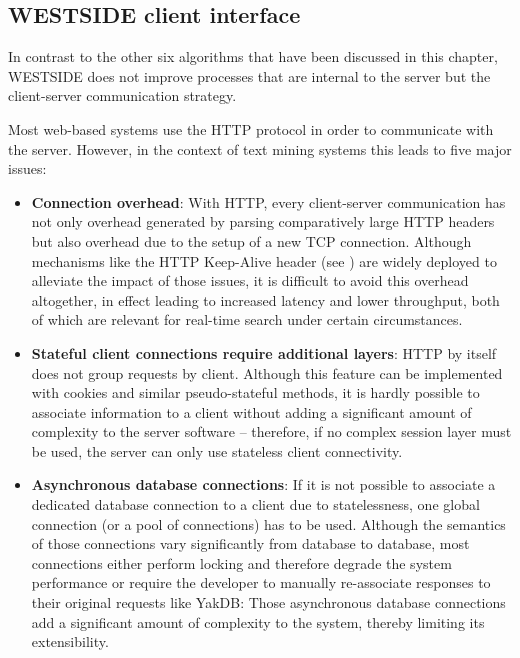 \documentclass[a4paper, 12pt, twoside, reqn]{report}
\numberwithin{figure}{chapter}
\newtheorem[L]{boxedDefinition}{Definition}
\newtheorem[L]{boxedExample}{Example}
\begin{document}
\afterpage{\clearpage}


\subsection{WESTSIDE client interface}\label{sec:westside}

In contrast to the other six algorithms that have been discussed in this chapter, WESTSIDE does not improve processes that are internal to the server but the client-server communication strategy.

Most web-based systems use the HTTP protocol in order to communicate with the server. However, in the context of text mining systems this leads to five major issues:
\begin{itemize}
 \item \textbf{Connection overhead}: With HTTP, every client-server communication has not only overhead generated by parsing comparatively large HTTP headers but also overhead due to the setup of a new TCP connection. Although mechanisms like the HTTP Keep-Alive header (see \cite{nielsen1997network}) are widely deployed to alleviate the impact of those issues, it is difficult to avoid this overhead altogether, in effect leading to increased latency and lower throughput, both of which are relevant for real-time search under certain circumstances.
 
 \item \textbf{Stateful client connections require additional layers}: HTTP by itself does not group requests by client. Although this feature can be implemented with cookies and similar pseudo-stateful methods, it is hardly possible to associate information to a client without adding a significant amount of complexity to the server software -- therefore, if no complex session layer must be used, the server can only use stateless client connectivity.
 
 \item \textbf{Asynchronous database connections}: If it is not possible to associate a dedicated database connection to a client due to statelessness, one global connection (or a pool of connections) has to be used. Although the semantics of those connections vary significantly from database to database, most connections either perform locking and therefore degrade the system performance or require the developer to manually re-associate responses to their original requests like YakDB: Those asynchronous database connections add a significant amount of complexity to the system, thereby limiting its extensibility.
 

\end{itemize}
\end{document}
